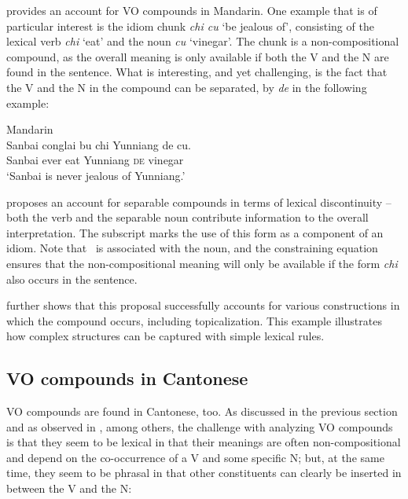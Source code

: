 \documentclass[output=paper,chinesefont,hidelinks]{langscibook}
\begin{document}
\citet{Huang1990} provides an account for VO compounds in Mandarin. One example that is of particular interest is the idiom chunk \textit{chi cu} `be jealous of', consisting of the lexical verb \textit{chi} `eat' and the noun \textit{cu} `vinegar'. The chunk is a non-compositional compound, as the overall meaning is only available if both the V and the N are found in the sentence. What is interesting, and yet challenging, is the fact that the V and the N in the compound can be separated, by \textit{de} in the following example:

\ea%
    \label{ex:Sinitic:45} Mandarin\\
    \gll Sanbai  conglai bu chi  Yunniang de cu.\\
         Sanbai  ever     {\NEG} eat  Yunniang  \textsc{de} vinegar\\
    \glt`Sanbai is never jealous of Yunniang.'
    \z

\citet{Huang1990} proposes an account for separable compounds in terms of lexical discontinuity – both the verb and the separable noun contribute information to the overall interpretation. The subscript marks the use of this form as a component of an idiom.  Note that \PRED\ is associated with the noun, and the constraining equation ensures that the non-compositional meaning will only be available if the form \textit{chi} also occurs in the sentence.

\ea%
\label{ex:Sinitic:46}
\ea {}
\ex {}
    \z\z

\citet{Huang1990} further shows that this proposal successfully accounts for various constructions in which the compound occurs, including topicalization. This example illustrates how complex structures can be captured with simple lexical rules.

\subsection{VO compounds in Cantonese}
\label{sec:Sinitic:4.3.1.1}

VO compounds are found in Cantonese, too. As discussed in the previous section and as observed in \citet{BodomoYuChe2017}, among others, the challenge with analyzing VO compounds is that they seem to be lexical in that their meanings are often non-compositional and depend on the co-occurrence of a V and some specific N; but, at the same time, they seem to be phrasal in that other constituents can clearly be inserted in between the V and the N:
\end{document}
